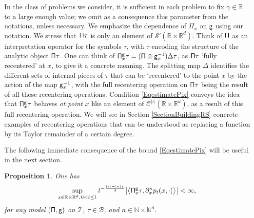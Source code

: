 \documentclass[10pt, reqno]{amsart}
\numberwithin{subsection}{section}
\numberwithin{subsubsection}{subsection}
\numberwithin{equation}{section} %
\theoremstyle{mystyle}
\newtheorem{prop}[thm]{\hspace{-0.13cm} {Proposition}}%
\theoremstyle{mystyle2}
\theoremstyle{mystyle3}
\newcommand{\ssk}{\smallskip}
\newcommand\bbN{\mathbb{N}}
\newcommand\bbR{\mathbb{R}}
\newcommand{\mcB}{\mathcal{B}}
\newcommand{\mcC}{\mathcal{C}}
\newcommand\mcS{\mathcal{S}}
\begin{document}
\ssk

In the class of problems we consider, it is sufficient in each problem to fix $\gamma\in\bbR$ to a large enough value; we omit as a consequence this parameter from the notations, unless necessary. We emphasize the dependence of $\Pi_x$ on $\sf g$ using our notation. We stress that ${\sf\Pi}\tau$ is only an element of $\mcS'(\bbR\times\bbR^d)$. Think of ${\sf\Pi}$ as an interpretation operator for the symbols $\tau$, with $\tau$ encoding the structure of the analytic object ${\sf\Pi}\tau$. One can think of ${\sf\Pi}^{\sf g}_x\tau=({\sf\Pi}\otimes{\sf g}_x^{-1})\Delta\tau$, as ${\sf \Pi}\tau$ `fully recentered' at $x$, to give it a concrete meaning. The splitting map $\Delta$ identifies the different sets of internal pieces of $\tau$ that can be `recentered' to the point $x$ by the action of the map ${\sf g}_x^{-1}$, with the full recentering operation on ${\sf \Pi}\tau$ being the result of all these recentering operations. Condition \eqref{EqestimatePix} conveys the idea that ${\sf\Pi}^{\sf g}_x\tau$ behaves \textit{at point $x$} like an element of $\mcC^{|\tau|}(\bbR\times\bbR^d)$, as a result of this full recentering operation. We will see in Section \ref{SectionBuildingRS} concrete examples of recentering operations that can be understood as replacing a function by its Taylor remainder of a certain degree.    

The following immediate consequence of the bound \eqref{EqestimatePix} will be useful in the next section.

\medskip

\begin{prop} \label{PropModelsOnKernels}
One has
$$
\sup_{x\in\bbR\times\bbR^d,\, 0<t\le 1} t^{-\frac{|\tau|-|n|_{\frak{s}}}{4}}
\big|\big\langle{\sf\Pi}_x^{\sf g}\tau , \partial_x^n p_t(x,\cdot) \big\rangle\big| < \infty,
$$
for any model $({\sf\Pi},{\sf g})$ on $\mathscr{T}$, $\tau\in\mcB$, and $n\in\bbN\times\bbN^d$.
\end{prop}

\medskip
\end{document}
